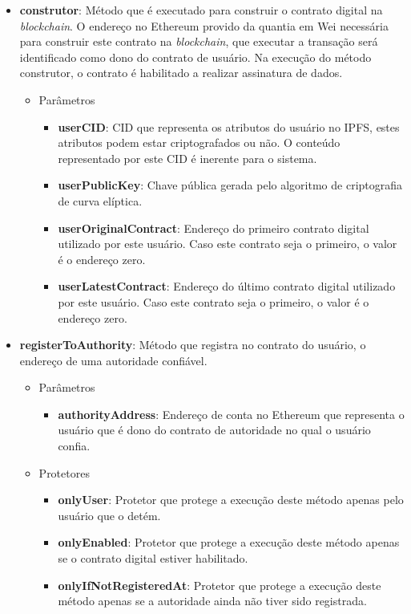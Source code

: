 \documentclass[tcc,capa]{texufpel}
\begin{document}
    \begin{itemize}
        \item \textbf{construtor}: Método que é executado para construir o contrato digital na \textit{blockchain}. O endereço no Ethereum provido da quantia em Wei necessária para construir este contrato na \textit{blockchain}, que executar a transação será identificado como dono do contrato de usuário. Na execução do método construtor, o contrato é habilitado a realizar assinatura de dados.
        \begin{itemize}
            \item Parâmetros
            \begin{itemize}
                \item \textbf{userCID}: CID que representa os atributos do usuário no IPFS, estes atributos podem estar criptografados ou não. O conteúdo representado por este CID é inerente para o sistema.
                \item \textbf{userPublicKey}: Chave pública gerada pelo algoritmo de criptografia de curva elíptica.
                \item \textbf{userOriginalContract}: Endereço do primeiro contrato digital utilizado por este usuário. Caso este contrato seja o primeiro, o valor é o endereço zero.
                \item \textbf{userLatestContract}: Endereço do último contrato digital utilizado por este usuário. Caso este contrato seja o primeiro, o valor é o endereço zero.
            \end{itemize}
        \end{itemize}
        
        \item \textbf{registerToAuthority}: Método que registra no contrato do usuário, o endereço de uma autoridade confiável.
        \begin{itemize}
            \item Parâmetros
            \begin{itemize}
                \item \textbf{authorityAddress}: Endereço de conta no Ethereum que representa o usuário que é dono do contrato de autoridade no qual o usuário confia.
            \end{itemize}
            \item Protetores
            \begin{itemize}
                \item \textbf{onlyUser}: Protetor que protege a execução deste método apenas pelo usuário que o detém.
                \item \textbf{onlyEnabled}: Protetor que protege a execução deste método apenas se o contrato digital estiver habilitado.
                \item \textbf{onlyIfNotRegisteredAt}: Protetor que protege a execução deste método apenas se a autoridade ainda não tiver sido registrada.
            \end{itemize}
        \end{itemize}
        

\end{itemize}
\end{document}
